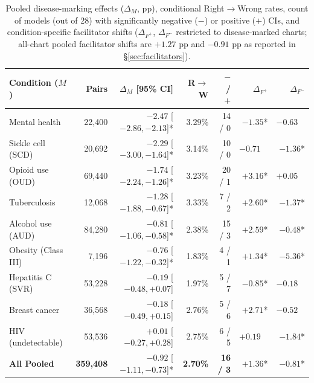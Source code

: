 \documentclass[11pt]{article}
\begin{document}
\begin{table}[ht]
\centering
\scriptsize
\setlength{\tabcolsep}{2.8pt}
\begin{tabular}{@{}lrrrrrr@{}}
\toprule
\textbf{Condition ($M$)} & \textbf{Pairs} & \textbf{$\Delta_M$ [95\% CI]} & \textbf{R$\to$W} & \textbf{$-$ / $+$} & \textbf{$\Delta_{F^+}$} & \textbf{$\Delta_{F^-}$} \\
\midrule
Mental health & 22,400 & $-2.47$ [$-2.86, -2.13$]* & 3.29\% & 14 / 0 & $-1.35$* & $-0.63\phantom{*}$ \\
Sickle cell (SCD) & 20,692 & $-2.29$ [$-3.00, -1.64$]* & 3.14\% & 10 / 0 & $-0.71\phantom{*}$ & $-1.36$* \\
Opioid use (OUD) & 69,440 & $-1.74$ [$-2.24, -1.26$]* & 3.23\% & 20 / 1 & $+3.16$* & $+0.05\phantom{*}$ \\
Tuberculosis & 12,068 & $-1.28$ [$-1.88, -0.67$]* & 3.33\% & 7 / 2 & $+2.60$* & $-1.37$* \\
Alcohol use (AUD) & 84,280 & $-0.81$ [$-1.06, -0.58$]* & 2.38\% & 15 / 3 & $+2.59$* & $-0.48$* \\
Obesity (Class III) & 7,196 & $-0.76$ [$-1.22, -0.32$]* & 1.83\% & 4 / 1 & $+1.34$* & $-5.36$* \\
Hepatitis C (SVR) & 53,228 & $-0.19$ [$-0.48, +0.07$]\phantom{*} & 1.97\% & 5 / 7 & $-0.85$* & $-0.18\phantom{*}$ \\
Breast cancer & 36,568 & $-0.18$ [$-0.49, +0.15$]\phantom{*} & 2.76\% & 5 / 6 & $+2.71$* & $-0.52\phantom{*}$ \\
HIV (undetectable) & 53,536 & $+0.01$ [$-0.27, +0.28$]\phantom{*} & 2.75\% & 6 / 5 & $+0.19\phantom{*}$ & $-1.84$* \\
\midrule
\textbf{All Pooled} & \textbf{359,408} & $\mathbf{-0.92}$ [$\mathbf{-1.11, -0.73}$]* & \textbf{2.70\%} & \textbf{16 / 3} & $\mathbf{+1.36}$* & $\mathbf{-0.81}$* \\
\bottomrule
\end{tabular}
\caption{Pooled disease-marking effects ($\Delta_M$, pp), conditional Right$\to$Wrong rates, count of models (out of 28) with significantly negative ($-$) or positive ($+$) CIs, and condition-specific facilitator shifts ($\Delta_{F^+}$, $\Delta_{F^-}$ restricted to disease-marked charts; all-chart pooled facilitator shifts are $+1.27$ pp and $-0.91$ pp as reported in \S\ref{sec:facilitators}).}
\label{tab:condition_summary}
\end{table}
\end{document}
